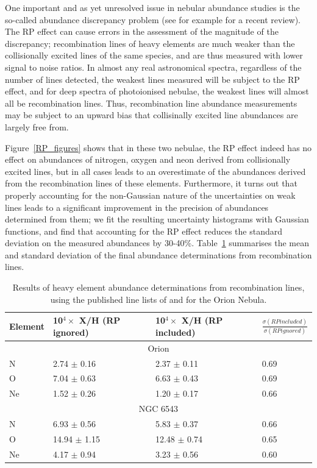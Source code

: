 \documentclass[useAMS,usenatbib]{mn2e}
\begin{document}
One important and as yet unresolved issue in nebular abundance studies is the so-called abundance discrepancy problem (see for example \citet{2006IAUS..234..219L} for a recent review).  The RP effect can cause errors in the assessment of the magnitude of the discrepancy; recombination lines of heavy elements are much weaker than the collisionally excited lines of the same species, and are thus measured with lower signal to noise ratios.  In almost any real astronomical spectra, regardless of the number of lines detected, the weakest lines measured will be subject to the RP effect, and for deep spectra of photoionised nebulae, the weakest lines will almost all be recombination lines.  Thus, recombination line abundance measurements may be subject to an upward bias that collisinally excited line abundances are largely free from.

Figure~\ref{RP_figures} shows that in these two nebulae, the RP effect indeed has no effect on abundances of nitrogen, oxygen and neon derived from collisionally excited lines, but in all cases leads to an overestimate of the abundances derived from the recombination lines of these elements.  Furthermore, it turns out that properly accounting for the non-Gaussian nature of the uncertainties on weak lines leads to a significant improvement in the precision of abundances determined from them; we fit the resulting uncertainty histograms with Gaussian functions, and find that accounting for the RP effect reduces the standard deviation on the measured abundances by 30-40\%.  Table~\ref{RP_numbers} summarises the mean and standard deviation of the final abundance determinations from recombination lines.

\begin{table}
\begin{tabular}{l ll l}
\hline
Element & 10$^4 \times$ X/H (RP ignored) & 10$^4 \times$ X/H (RP included) & $\frac{\sigma (RP included)}{\sigma (RP ignored)}$ \\
\hline
\multicolumn{4}{c}{Orion}\\

N & 2.74 $\pm$ 0.16 & 2.37 $\pm$ 0.11 & 0.69 \\
O & 7.04 $\pm$ 0.63 & 6.63 $\pm$ 0.43 & 0.69 \\
Ne & 1.52 $\pm$ 0.26 & 1.20 $\pm$ 0.17 & 0.66 \\

\multicolumn{4}{c}{NGC 6543} \\

N & 6.93 $\pm$  0.56 & 5.83 $\pm$  0.37 & 0.66 \\
O & 14.94 $\pm$ 1.15 & 12.48 $\pm$ 0.74 & 0.65 \\
Ne & 4.17 $\pm$ 0.94 & 3.23 $\pm$ 0.56 & 0.60 \\
\hline
\end{tabular}
\caption{Results of heavy element abundance determinations from recombination lines, using the published line lists of \citet{2004MNRAS.351.1026W} and \citet{2004MNRAS.355..229E} for the Orion Nebula.}
\label{RP_numbers}
\end{table}
\end{document}
